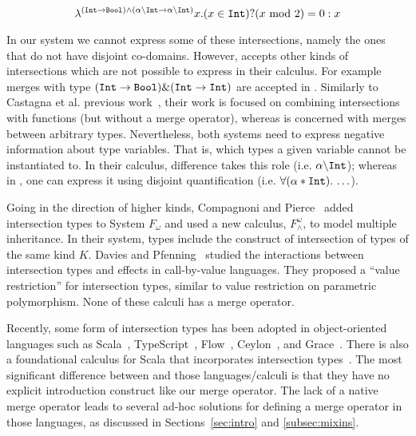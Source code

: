 \[
\lambda^{(\texttt{Int} \to \texttt{Bool}) \wedge (\alpha \backslash \texttt{Int} \to \alpha \backslash \texttt{Int})} 
x. (x \in \texttt{Int}) ? (x \text{ mod } 2) = 0 : x
\]

\noindent In our system we cannot express some of these intersections,
namely the ones that do not have disjoint co-domains.  However, \name
accepts other kinds of intersections which are not possible to express
in their calculus. For example merges with type $(\texttt{Int} \to \texttt{Bool})
\& (\texttt{Int} \to \texttt{Int})$ are accepted in \name.  Similarly to
Castagna et al. previous work~\cite{castagna1995calculus}, their work is
focused on combining intersections with functions (but without a merge
operator), whereas \name is concerned with merges between arbitrary
types.
Nevertheless, both systems need to express negative information about
type variables.
That is, which types a given variable cannot be instantiated to.
In their calculus, difference takes this role (i.e. $\alpha\backslash\texttt{Int}$); 
whereas in \name, one can express it using disjoint quantification 
(i.e. $\forall (\alpha * \texttt{Int}).\, \ldots$). 

Going in the direction of higher
kinds, Compagnoni and Pierce~\cite{comppier96} added
intersection types to System $ F_{\omega} $ and used a new calculus,
$ F^{\omega}_{\wedge} $, to model multiple inheritance. 
In their system, types include the construct of intersection of types of the
same kind $ K $. 
Davies and Pfenning~\cite{davies2000intersection} studied the interactions between
intersection types and effects in call-by-value languages. 
They proposed a ``value restriction'' for intersection types, similar to
value restriction on parametric polymorphism. None of these calculi
has a merge operator.

Recently, some form of intersection types has been adopted in
object-oriented languages such as Scala~\cite{scala-overview}, 
TypeScript~\cite{typescript}, Flow~\cite{flow}, Ceylon~\cite{ceylon}, and
Grace~\cite{black2012grace}.
There is also a foundational calculus for Scala
that incorporates intersection types~\cite{rompf2016soundness}.
The most significant difference between \name 
and those languages/calculi is that
they have no explicit introduction construct
like our merge operator.  The lack of a native merge operator
 leads to several ad-hoc solutions for
defining a merge operator in those languages, as discussed in
Sections~\ref{sec:intro} and \ref{subsec:mixins}.

